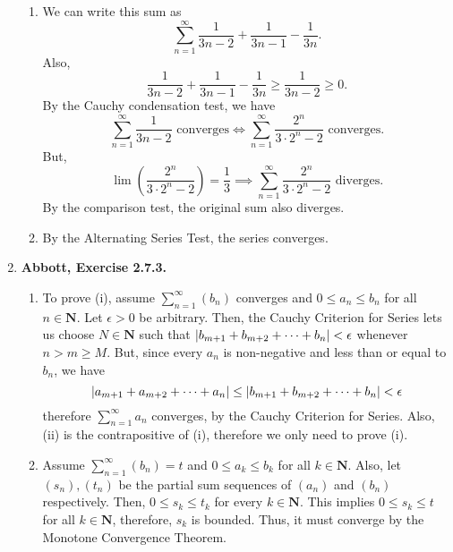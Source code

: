 \documentclass{article}
\DeclarePairedDelimiter\abs{\lvert}{\rvert}
\newcommand{\N}{\mathbf{N}}
\newcommand{\exc}[2][Abbott]{\item \textbf{#1, Exercise #2.}}
\newcommand{\lep}[1][L]{#1et $\epsilon > 0$ be arbitrary}
\begin{document}
\begin{enumerate}
\begin{enumerate}
        \item We can write this sum as 
        \begin{equation*}
            \sum_{n=1}^\infty \frac{1}{3n-2}+\frac{1}{3n-1}-\frac{1}{3n}.
        \end{equation*} Also, 
        \begin{equation*}
             \frac{1}{3n-2}+\frac{1}{3n-1}-\frac{1}{3n} \geq \frac{1}{3n-2} \geq 0.
        \end{equation*} By the Cauchy condensation test, we have
        \begin{equation*}
            \sum_{n=1}^\infty \frac{1}{3n-2} \text{ converges} \iff 
            \sum_{n=1}^\infty \frac{2^n}{3\cdot2^n-2} \text{ converges.}
        \end{equation*} But, 
        \begin{equation*}
            \lim\left({\frac{2^n}{3\cdot2^n-2}}\right) = \frac{1}{3} \implies 
            \sum_{n=1}^\infty \frac{2^n}{3\cdot2^n-2} \text{ diverges.}
        \end{equation*} By the comparison test, the original sum also diverges.
        
        \item By the Alternating Series Test, the series converges.
    \end{enumerate}
    
    \exc{2.7.3}
    \begin{enumerate}
        \item To prove (i), assume $\sum_{n=1}^\infty (b_n)$ converges and $0 \leq a_n \leq b_n$ for all $n \in \N$. \lep. Then, the Cauchy Criterion for Series lets us choose $N \in \N$ such that $\abs*{b_{m+1}+b_{m+2} + \dots + b_{n}} < \epsilon$ whenever $n > m \geq M$. But, since every $a_n$ is non-negative and less than or equal to $b_n$, we have 
        \begin{equation*}
           \abs*{a_{m+1}+a_{m+2} + \dots + a_{n}} \leq \abs*{b_{m+1}+b_{m+2} + \dots + b_{n}} < \epsilon
        \end{equation*} therefore $\sum_{n=1}^\infty a_n$ converges, by the Cauchy Criterion for Series. Also, (ii) is the contrapositive of (i), therefore we only need to prove (i).
        
        \item Assume $\sum_{n=1}^\infty (b_n) = t$ and $0 \leq a_k \leq b_k$ for all $k \in \N$. Also, let $(s_n), (t_n)$ be the partial sum sequences of $(a_n)$ and $(b_n)$ respectively. Then, $0 \leq s_k \leq t_k$ for every $k \in \N$. This implies $0 \leq s_k \leq t$ for all $k \in \N$, therefore, $s_k$ is bounded. Thus, it must converge by the Monotone Convergence Theorem.
    \end{enumerate}
    

\end{enumerate}
\end{document}
